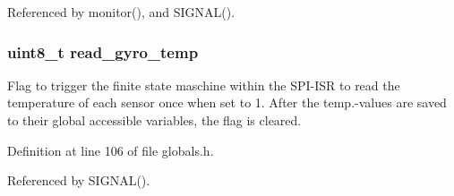 Referenced by monitor(), and SIGNAL().
\subsubsection{\setlength{\rightskip}{0pt plus 5cm}uint8\_\-t {\bf read\_\-gyro\_\-temp}}\label{group__ro__globals_g8d32c2ec3033cada7fc3073d5d1e18e8}


Flag to trigger the finite state maschine within the SPI-ISR to read the temperature of each sensor once when set to 1. After the temp.-values are saved to their global accessible variables, the flag is cleared. 

Definition at line 106 of file globals.h.

Referenced by SIGNAL().